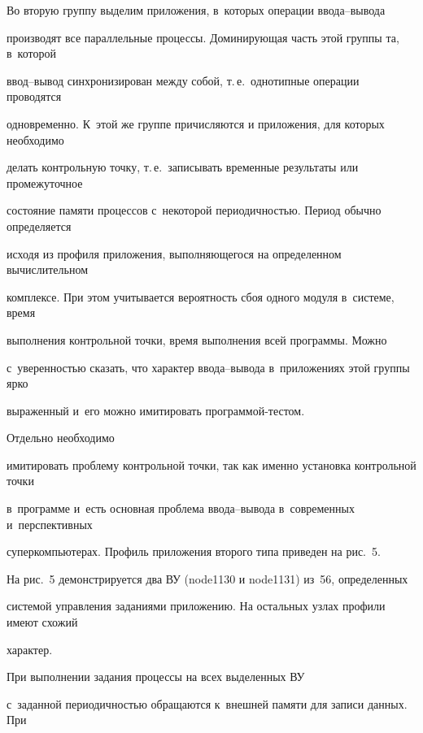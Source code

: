      Во вторую группу выделим приложения, в~которых операции вво\-да--вы\-во\-да


производят все параллельные процессы. Доминирующая часть этой группы та, в~которой


ввод--вы\-вод синхронизирован между собой, т.\,е.\ однотипные операции проводятся


одновременно. К~этой же группе причисляются и приложения, для которых необходимо


делать контрольную точку, т.\,е.\ записывать временные результаты или промежуточное


со\-сто\-яние памяти процессов с~некоторой периодичностью. Период обычно определяется


ис\-хо\-дя из профиля приложения, выполняющегося на определенном вы\-чис\-ли\-тель\-ном


комплексе. При этом учитывается вероятность сбоя одного модуля в~сис\-те\-ме, время


выполнения контрольной точки, время выполнения всей программы. Можно


с~уверенностью сказать, что характер вво\-да--вы\-во\-да в~приложениях этой группы ярко


выраженный и~его можно имитировать программой-тестом.


Отдельно необходимо


имитировать проб\-ле\-му контрольной точки, так как  именно установка контрольной точки


в~программе и~есть основная проб\-ле\-ма вво\-да--вы\-во\-да в~современных и~перспективных


суперкомпьютерах. Профиль приложения второго типа приведен на рис.~5.








      На рис.~5 демонстрируется два ВУ (node1130 и node1131) из~56, определенных


сис\-те\-мой управ\-ле\-ния заданиями приложению. На остальных узлах профили имеют схожий


характер.














      При выполнении задания процессы на всех выделенных ВУ


с~заданной периодичностью обращаются к~внешней памяти для записи данных. При


